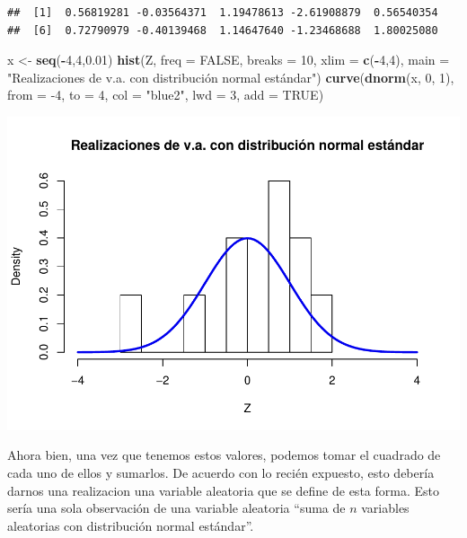 \documentclass[]{article}
\newenvironment{Shaded}{\begin{snugshade}}{\end{snugshade}}
\newcommand{\DataTypeTok}[1]{\textcolor[rgb]{0.13,0.29,0.53}{#1}}
\newcommand{\DecValTok}[1]{\textcolor[rgb]{0.00,0.00,0.81}{#1}}
\newcommand{\FloatTok}[1]{\textcolor[rgb]{0.00,0.00,0.81}{#1}}
\newcommand{\KeywordTok}[1]{\textcolor[rgb]{0.13,0.29,0.53}{\textbf{#1}}}
\newcommand{\NormalTok}[1]{#1}
\newcommand{\OperatorTok}[1]{\textcolor[rgb]{0.81,0.36,0.00}{\textbf{#1}}}
\newcommand{\OtherTok}[1]{\textcolor[rgb]{0.56,0.35,0.01}{#1}}
\newcommand{\StringTok}[1]{\textcolor[rgb]{0.31,0.60,0.02}{#1}}
\begin{document}
\begin{verbatim}
##  [1]  0.56819281 -0.03564371  1.19478613 -2.61908879  0.56540354
##  [6]  0.72790979 -0.40139468  1.14647640 -1.23468688  1.80025080
\end{verbatim}

\begin{Shaded}
\begin{Highlighting}[]
\NormalTok{x <-}\StringTok{ }\KeywordTok{seq}\NormalTok{(}\OperatorTok{-}\DecValTok{4}\NormalTok{,}\DecValTok{4}\NormalTok{,}\FloatTok{0.01}\NormalTok{)}
\KeywordTok{hist}\NormalTok{(Z, }\DataTypeTok{freq =} \OtherTok{FALSE}\NormalTok{, }
     \DataTypeTok{breaks  =} \DecValTok{10}\NormalTok{,}
     \DataTypeTok{xlim    =} \KeywordTok{c}\NormalTok{(}\OperatorTok{-}\DecValTok{4}\NormalTok{,}\DecValTok{4}\NormalTok{),}
     \DataTypeTok{main    =} \StringTok{"Realizaciones de v.a. con distribución normal estándar"}\NormalTok{)}
\KeywordTok{curve}\NormalTok{(}\KeywordTok{dnorm}\NormalTok{(x, }\DecValTok{0}\NormalTok{, }\DecValTok{1}\NormalTok{),}
      \DataTypeTok{from =} \DecValTok{-4}\NormalTok{, }\DataTypeTok{to =} \DecValTok{4}\NormalTok{,}
      \DataTypeTok{col  =} \StringTok{"blue2"}\NormalTok{,}
      \DataTypeTok{lwd  =} \DecValTok{3}\NormalTok{,}
      \DataTypeTok{add =} \OtherTok{TRUE}\NormalTok{)}
\end{Highlighting}
\end{Shaded}

\includegraphics{NotaDeClaseLong_files/figure-latex/unnamed-chunk-8-1.pdf}

Ahora bien, una vez que tenemos estos valores, podemos tomar el cuadrado
de cada uno de ellos y sumarlos. De acuerdo con lo recién expuesto, esto
debería darnos una realizacion una variable aleatoria que se define de
esta forma. Esto sería una sola observación de una variable aleatoria
``suma de \(n\) variables aleatorias con distribución normal estándar''.
\end{document}
